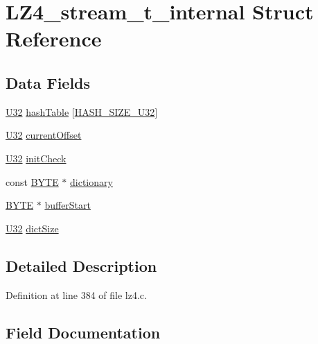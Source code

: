 \hypertarget{structLZ4__stream__t__internal}{}\section{L\+Z4\+\_\+stream\+\_\+t\+\_\+internal Struct Reference}
\label{structLZ4__stream__t__internal}
\subsection*{Data Fields}
\begin{DoxyCompactItemize}
\item 
\mbox{\hyperlink{lz4_8c_ac3df7cf3c8cb172a588adec881447d68}{U32}} \mbox{\hyperlink{structLZ4__stream__t__internal_a81762be862caad87455554f2d39d4a29}{hash\+Table}} \mbox{[}\mbox{\hyperlink{lz4_8c_a10355a0f2e4e7f206a362ffa2272ec22}{H\+A\+S\+H\+\_\+\+S\+I\+Z\+E\+\_\+\+U32}}\mbox{]}
\item 
\mbox{\hyperlink{lz4_8c_ac3df7cf3c8cb172a588adec881447d68}{U32}} \mbox{\hyperlink{structLZ4__stream__t__internal_a2cdbcab32d03f345fd3c37af43c45523}{current\+Offset}}
\item 
\mbox{\hyperlink{lz4_8c_ac3df7cf3c8cb172a588adec881447d68}{U32}} \mbox{\hyperlink{structLZ4__stream__t__internal_a210c641599a4633cbf4e590cbc7a0a58}{init\+Check}}
\item 
const \mbox{\hyperlink{lz4_8c_a4ae1dab0fb4b072a66584546209e7d58}{B\+Y\+TE}} $\ast$ \mbox{\hyperlink{structLZ4__stream__t__internal_aea78f571ae3100b95df66b1d39c48aee}{dictionary}}
\item 
\mbox{\hyperlink{lz4_8c_a4ae1dab0fb4b072a66584546209e7d58}{B\+Y\+TE}} $\ast$ \mbox{\hyperlink{structLZ4__stream__t__internal_ae97c8d0df5e183aaba780e69655f923e}{buffer\+Start}}
\item 
\mbox{\hyperlink{lz4_8c_ac3df7cf3c8cb172a588adec881447d68}{U32}} \mbox{\hyperlink{structLZ4__stream__t__internal_a39e9e581f2a3c904bb1a912fd1611e72}{dict\+Size}}
\end{DoxyCompactItemize}


\subsection{Detailed Description}


Definition at line 384 of file lz4.\+c.



\subsection{Field Documentation}
\mbox{\label{structLZ4__stream__t__internal_ae97c8d0df5e183aaba780e69655f923e}} 
